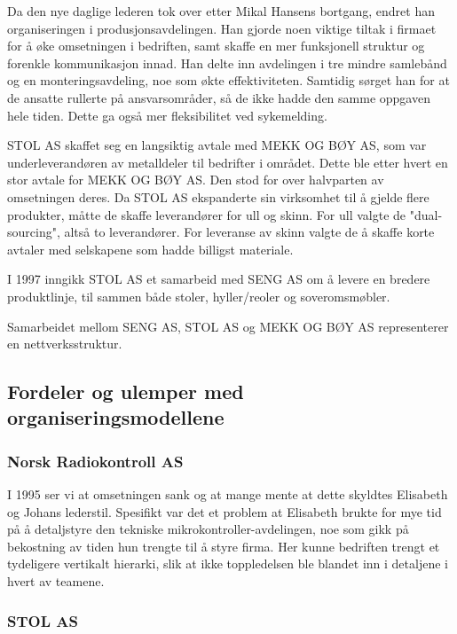 Da den nye daglige lederen tok over etter Mikal Hansens bortgang, endret han organiseringen i produsjonsavdelingen.
Han gjorde noen viktige tiltak i firmaet for å øke omsetningen i bedriften, samt skaffe en mer funksjonell struktur og forenkle kommunikasjon innad.
Han delte inn avdelingen i tre mindre samlebånd og en monteringsavdeling, noe som økte effektiviteten. Samtidig sørget han for at de ansatte rullerte på ansvarsområder, så de ikke hadde den samme oppgaven hele tiden. Dette ga også mer fleksibilitet ved sykemelding.

STOL AS skaffet seg en langsiktig avtale med MEKK OG BØY AS, som var underleverandøren av metalldeler til bedrifter i området. Dette ble etter hvert en stor avtale for MEKK OG BØY AS. Den stod for over halvparten av omsetningen deres. Da STOL AS ekspanderte sin virksomhet til å gjelde flere produkter, måtte de skaffe leverandører for ull og skinn. For ull valgte de "dual-sourcing", altså to leverandører. For leveranse av skinn valgte de å skaffe korte avtaler med selskapene som hadde billigst materiale.

I 1997 inngikk STOL AS et samarbeid med SENG AS om å levere en bredere produktlinje, til sammen både stoler, hyller/reoler og soveromsmøbler.

Samarbeidet mellom SENG AS, STOL AS og MEKK OG BØY AS representerer en nettverksstruktur.

\subsection{Fordeler og ulemper med organiseringsmodellene}

\subsubsection{Norsk Radiokontroll AS}

I 1995 ser vi at omsetningen sank og at mange mente at dette skyldtes Elisabeth og Johans lederstil.
Spesifikt var det et problem at Elisabeth brukte for mye tid på å detaljstyre den tekniske mikrokontroller-avdelingen, noe som gikk på bekostning av tiden hun trengte til å styre firma.
Her kunne bedriften trengt et tydeligere vertikalt hierarki, slik at ikke toppledelsen ble blandet inn i detaljene i hvert av teamene.

\subsubsection{STOL AS}

